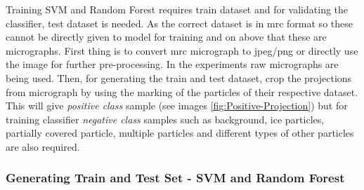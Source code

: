 \documentclass{report}
\begin{document}
Training SVM and Random Forest requires train dataset and for validating the classifier, test dataset is needed. As the correct dataset is in mrc format so these cannot be directly given to model for training and on above that these are micrographs. First thing is to convert mrc micrograph to jpeg/png or directly use the image for further pre-processing. In the experiments raw micrographs are being used. Then, for generating the train and test dataset, crop the projections from micrograph by using the marking of the particles of their respective dataset. This will give \textit{positive class} sample (see images \ref{fig:Positive-Projection}) but for training classifier \textit{negative class} samples such as background, ice particles, partially covered particle, multiple particles and different types of other particles are also required. \\
\subsubsection{Generating Train and Test Set - SVM and Random Forest}
\end{document}
